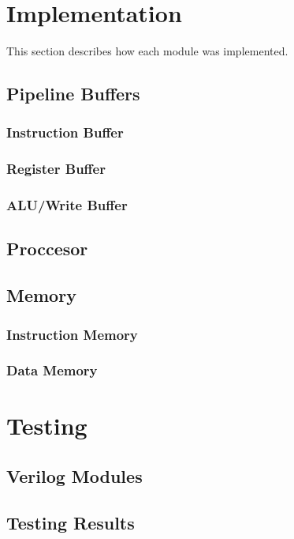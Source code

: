 \documentclass[conference]{IEEEtran}
\begin{document}
\section{Implementation}
This section describes how each module was implemented.

\subsection{Pipeline Buffers}
\subsubsection{Instruction Buffer}

\subsubsection{Register Buffer}

\subsubsection{ALU/Write Buffer}

\subsection{Proccesor}

\subsection{Memory}
\subsubsection{Instruction Memory}

\subsubsection{Data Memory}


\section{Testing}

\subsection{Verilog Modules}

\subsection{Testing Results}
\end{document}
